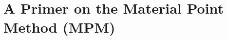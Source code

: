\chapter{A Primer on the Material Point Method (MPM)}
\begin{comment}
This \manuscript is a tutorial on the Material Point Method (MPM). The goal is to show you how to write your own MPM code assuming that you already have an FEM code available to modify, or at least can write one as needed. This tutorial does not explain syntax of any particular MPM code. 

A brief review of the finite-element method (FEM) is provided to establish notational choices made in this \manuscript and to form a starting point from which revisions are applied to convert an FEM code to an MPM code.  This review of FEM uses notation from \threeD problems with the expectation that the reader knows how to modify the discussion appropriately for lower-dimension problems. Following the broad review of FEM, this manuscript then summarizes specific FEM formulations for \oneD and \twoD problems, showing what revisions are needed to convert the FEM solver to an MPM solver.


\section{A review of FEM}
The reader is assumed to be familiar with the finite-element method (FEM), so this section is primarily focused on defining our notational preferences. 

\subsection{FEM grid, elements, nodes, and shape functions}
An FEM solution to a differential equation begins by introducing a body-fitted grid that tessellates the spatial domain into \Defn{elements}.\footnote{A \Defn{tesselation} breaks up a physical domain, here called a \Defn{body}, into a set of subdomains without gaps or overlaps.} 
%
In \twoD, some FEM codes break the body into quadrilateral elements, while other FEM codes use triangles (see \fig{fig:QuadAndTriangleMesh}). Higher-order methods use increasingly complicated shapes, but all choices have in common that the element shape is determined from special points on the element called \Defn{nodes}. The reader is presumed to be very comfortable working with nodes, elements, and \Defn{connectivity} (\ie the mapping of local node numbers on an element to/from global node numbers on the mesh).






\end{comment}
